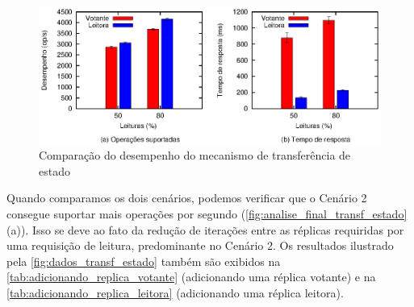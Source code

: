 \begin{figure}[ht]
  \centering
  \includegraphics[width=14cm]{conteudo/capitulos/figuras/final-transf-estado.eps}
  \caption{Comparação do desempenho do mecanismo de transferência de estado}
  \label{fig:analise_final_transf_estado}
\end{figure}

Quando comparamos os dois cenários, podemos verificar que o Cenário 2 consegue suportar
mais operações por segundo (\autoref{fig:analise_final_transf_estado} (a)). Isso se deve
ao fato da redução de iterações entre as réplicas requiridas por uma requisição de
leitura, predominante no Cenário 2. Os resultados ilustrado pela
\autoref{fig:dados_transf_estado} também são exibidos na
\autoref{tab:adicionando_replica_votante} (adicionando uma réplica votante) e na
\autoref{tab:adicionando_replica_leitora} (adicionando uma réplica leitora).

\begin{table}[htb]
\end{table}

\begin{table}[htb]
\end{table}


